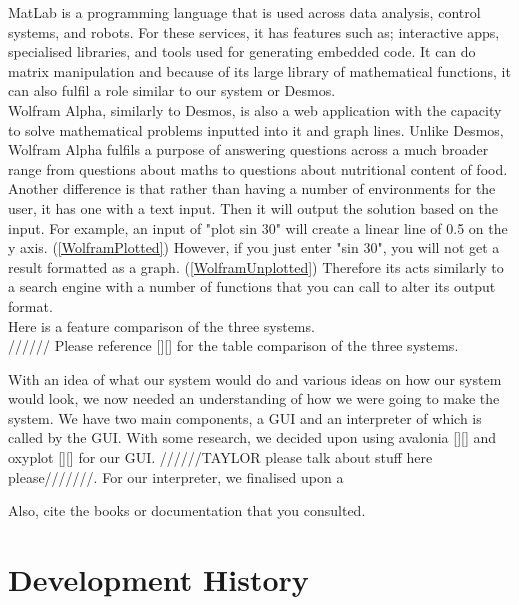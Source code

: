 \documentclass[a4paper, oneside, 11pt]{report}
\begin{document}
    MatLab is a programming language that is used across data analysis, control systems, and robots. For these services, it has features such as; interactive apps, specialised libraries, and tools used for generating embedded code. It can do matrix manipulation \citep{Matlab-Feat:2025} and because of its large library of mathematical functions, it can also fulfil a role similar to our system or Desmos. \\

    Wolfram Alpha, similarly to Desmos, is also a web application with the capacity to solve mathematical problems inputted into it and graph lines. Unlike Desmos, Wolfram Alpha fulfils a purpose of answering questions across a much broader range from questions about maths to questions about nutritional content of food. Another difference is that rather than having a number of environments for the user, it has one with a text input. Then it will output the solution based on the input. For example, an input of "plot sin 30" will create a linear line of 0.5 on the y axis. (\ref{WolframPlotted})
    However, if you just enter "sin 30", you will not get a result formatted as a graph. (\ref{WolframUnplotted})
    Therefore its acts similarly to a search engine with a number of functions that you can call to alter its output format. \\

    Here is a feature comparison of the three systems. \\//////
    Please reference [][] for the table comparison of the three systems.

    With an idea of what our system would do and various ideas on how our system would look, we now needed an understanding of how we were going to make the system. We have two main components, a GUI and an interpreter of which is called by the GUI. With some research, we decided upon using avalonia [][] and oxyplot [][] for our GUI. //////TAYLOR please talk about stuff here please///////. For our interpreter, we finalised upon a


    Also, cite the books \citep{Nystrom:2021} or documentation \citep{WPF:2023} that you consulted.
    \chapter{Development History}\label{Chap:DevHist}
\end{document}
